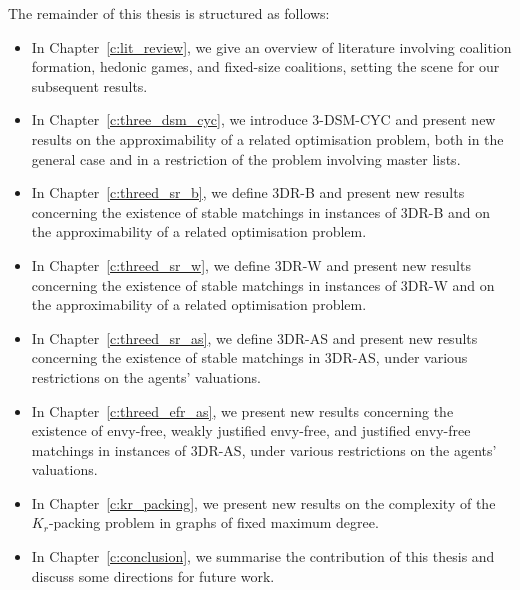 The remainder of this thesis is structured as follows:

\begin{itemize}
    \item In Chapter~\ref{c:lit_review}, we give an overview of literature involving coalition formation, hedonic games, and fixed-size coalitions, setting the scene for our subsequent results.
    
    \item In Chapter~\ref{c:three_dsm_cyc}, we introduce 3-DSM-CYC and present new results on the approximability of a related optimisation problem, both in the general case and in a restriction of the problem involving master lists.
    
    \item In Chapter~\ref{c:threed_sr_b}, we define 3DR-B and present new results concerning the existence of stable matchings in instances of 3DR-B and on the approximability of a related optimisation problem.
    
    \item In Chapter~\ref{c:threed_sr_w}, we define 3DR-W and present new results concerning the existence of stable matchings in instances of 3DR-W and on the approximability of a related optimisation problem.
    
    \item In Chapter~\ref{c:threed_sr_as}, we define 3DR-AS and present new results concerning the existence of stable matchings in 3DR-AS, under various restrictions on the agents' valuations.
    
    \item In Chapter~\ref{c:threed_efr_as}, we present new results concerning the existence of envy-free, weakly justified envy-free, and justified envy-free matchings in instances of 3DR-AS, under various restrictions on the agents' valuations.
    
    \item In Chapter~\ref{c:kr_packing}, we present new results on the complexity of the $K_r$-packing problem in graphs of fixed maximum degree.
    
    \item In Chapter~\ref{c:conclusion}, we summarise the contribution of this thesis and discuss some directions for future work.
\end{itemize}